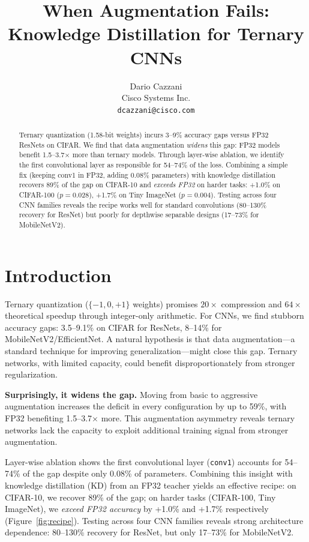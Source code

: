 \documentclass[10pt]{article}
\title{When Augmentation Fails: Knowledge Distillation for Ternary CNNs}
\author{
  Dario Cazzani\\
  Cisco Systems Inc.\\
  \texttt{dcazzani@cisco.com}
}
\begin{document}
\maketitle

\begin{abstract}
Ternary quantization (1.58-bit weights) incurs 3--9\% accuracy gaps versus FP32 ResNets on CIFAR. We find that data augmentation \emph{widens} this gap: FP32 models benefit 1.5--3.7$\times$ more than ternary models. Through layer-wise ablation, we identify the first convolutional layer as responsible for 54--74\% of the loss. Combining a simple fix (keeping conv1 in FP32, adding 0.08\% parameters) with knowledge distillation recovers 89\% of the gap on CIFAR-10 and \emph{exceeds FP32} on harder tasks: +1.0\% on CIFAR-100 ($p=0.028$), +1.7\% on Tiny ImageNet ($p=0.004$). Testing across four CNN families reveals the recipe works well for standard convolutions (80--130\% recovery for ResNet) but poorly for depthwise separable designs (17--73\% for MobileNetV2).
\end{abstract}

\section{Introduction}

Ternary quantization ($\{-1,0,+1\}$ weights) promises $20\times$ compression and $64\times$ theoretical speedup through integer-only arithmetic. For CNNs, we find stubborn accuracy gaps: 3.5--9.1\% on CIFAR for ResNets, 8--14\% for MobileNetV2/EfficientNet. A natural hypothesis is that data augmentation---a standard technique for improving generalization---might close this gap. Ternary networks, with limited capacity, could benefit disproportionately from stronger regularization.

\textbf{Surprisingly, it widens the gap.} Moving from basic to aggressive augmentation increases the deficit in every configuration by up to 59\%, with FP32 benefiting 1.5--3.7$\times$ more. This augmentation asymmetry reveals ternary networks lack the capacity to exploit additional training signal from stronger augmentation.

Layer-wise ablation shows the first convolutional layer (\texttt{conv1}) accounts for 54--74\% of the gap despite only 0.08\% of parameters. Combining this insight with knowledge distillation (KD) from an FP32 teacher yields an effective recipe: on CIFAR-10, we recover 89\% of the gap; on harder tasks (CIFAR-100, Tiny ImageNet), we \emph{exceed FP32 accuracy} by +1.0\% and +1.7\% respectively (Figure~\ref{fig:recipe}). Testing across four CNN families reveals strong architecture dependence: 80--130\% recovery for ResNet, but only 17--73\% for MobileNetV2.
\end{document}
